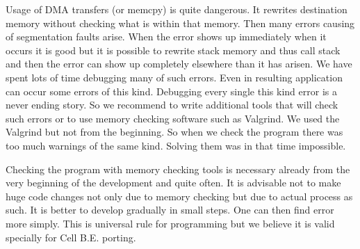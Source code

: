 \par
Usage of DMA transfers (or memcpy) is quite dangerous.
It rewrites destination memory without checking what is within that memory.
Then many errors causing of segmentation faults arise.
When the error shows up immediately when it occurs it is good but it is possible to rewrite stack memory and thus call stack and then the error can show up completely elsewhere than it has arisen.
We have spent lots of time debugging many of such errors.
Even in resulting application can occur some errors of this kind.
Debugging every single this kind error is a never ending story.
So we recommend to write additional tools that will check such errors or to use memory checking software such as Valgrind.
We used the Valgrind but not from the beginning.
So when we check the program there was too much warnings of the same kind.
Solving them was in that time impossible.

\par
Checking the program with memory checking tools is necessary already from the very beginning of the development and quite often.
It is advisable not to make huge code changes not only due to memory checking but due to actual process as such.
It is better to develop gradually in small steps.
One can then find error more simply.
This is universal rule for programming but we believe it is valid specially for Cell B.E. porting.